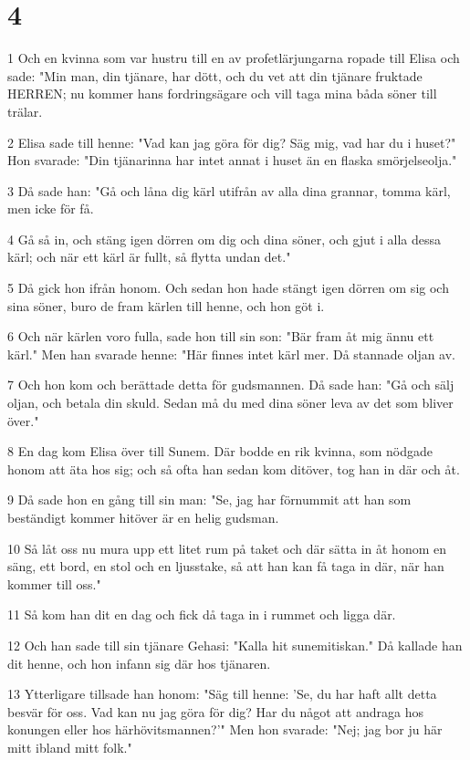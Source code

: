\chapter{4}

\par 1 Och en kvinna som var hustru till en av profetlärjungarna ropade till Elisa och sade: "Min man, din tjänare, har dött, och du vet att din tjänare fruktade HERREN; nu kommer hans fordringsägare och vill taga mina båda söner till trälar.
\par 2 Elisa sade till henne: "Vad kan jag göra för dig? Säg mig, vad har du i huset?" Hon svarade: "Din tjänarinna har intet annat i huset än en flaska smörjelseolja."
\par 3 Då sade han: "Gå och låna dig kärl utifrån av alla dina grannar, tomma kärl, men icke för få.
\par 4 Gå så in, och stäng igen dörren om dig och dina söner, och gjut i alla dessa kärl; och när ett kärl är fullt, så flytta undan det."
\par 5 Då gick hon ifrån honom. Och sedan hon hade stängt igen dörren om sig och sina söner, buro de fram kärlen till henne, och hon göt i.
\par 6 Och när kärlen voro fulla, sade hon till sin son: "Bär fram åt mig ännu ett kärl." Men han svarade henne: "Här finnes intet kärl mer. Då stannade oljan av.
\par 7 Och hon kom och berättade detta för gudsmannen. Då sade han: "Gå och sälj oljan, och betala din skuld. Sedan må du med dina söner leva av det som bliver över."
\par 8 En dag kom Elisa över till Sunem. Där bodde en rik kvinna, som nödgade honom att äta hos sig; och så ofta han sedan kom ditöver, tog han in där och åt.
\par 9 Då sade hon en gång till sin man: "Se, jag har förnummit att han som beständigt kommer hitöver är en helig gudsman.
\par 10 Så låt oss nu mura upp ett litet rum på taket och där sätta in åt honom en säng, ett bord, en stol och en ljusstake, så att han kan få taga in där, när han kommer till oss."
\par 11 Så kom han dit en dag och fick då taga in i rummet och ligga där.
\par 12 Och han sade till sin tjänare Gehasi: "Kalla hit sunemitiskan." Då kallade han dit henne, och hon infann sig där hos tjänaren.
\par 13 Ytterligare tillsade han honom: "Säg till henne: 'Se, du har haft allt detta besvär för oss. Vad kan nu jag göra för dig? Har du något att andraga hos konungen eller hos härhövitsmannen?'" Men hon svarade: "Nej; jag bor ju här mitt ibland mitt folk."
